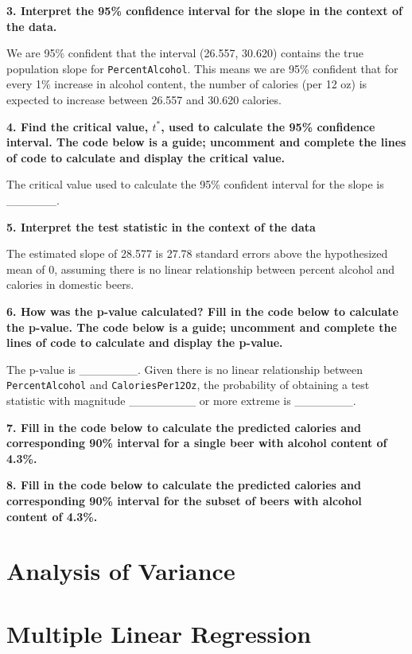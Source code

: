 \documentclass[]{book}
\begin{document}
\textbf{3. Interpret the 95\% confidence interval for the slope in the
context of the data.}

We are 95\% confident that the interval (26.557, 30.620) contains the
true population slope for \texttt{PercentAlcohol}. This means we are
95\% confident that for every 1\% increase in alcohol content, the
number of calories (per 12 oz) is expected to increase between 26.557
and 30.620 calories.

\textbf{4. Find the critical value, \(t^*\), used to calculate the 95\%
confidence interval. The code below is a guide; uncomment and complete
the lines of code to calculate and display the critical value.}

The critical value used to calculate the 95\% confident interval for the
slope is \_\_\_\_\_\_.

\textbf{5. Interpret the test statistic in the context of the data}

The estimated slope of 28.577 is 27.78 standard errors above the
hypothesized mean of 0, assuming there is no linear relationship between
percent alcohol and calories in domestic beers.

\textbf{6. How was the p-value calculated? Fill in the code below to
calculate the p-value. The code below is a guide; uncomment and complete
the lines of code to calculate and display the p-value.}

The p-value is \_\_\_\_\_\_\_. Given there is no linear relationship
between \texttt{PercentAlcohol} and \texttt{CaloriesPer12Oz}, the
probability of obtaining a test statistic with magnitude
\_\_\_\_\_\_\_\_ or more extreme is \_\_\_\_\_\_\_.

\textbf{7. Fill in the code below to calculate the predicted calories
and corresponding 90\% interval for a single beer with alcohol content
of 4.3\%.}

\textbf{8. Fill in the code below to calculate the predicted calories
and corresponding 90\% interval for the subset of beers with alcohol
content of 4.3\%.}

\chapter{Analysis of Variance}\label{anova}

\chapter{Multiple Linear Regression}\label{mlr}
\end{document}
